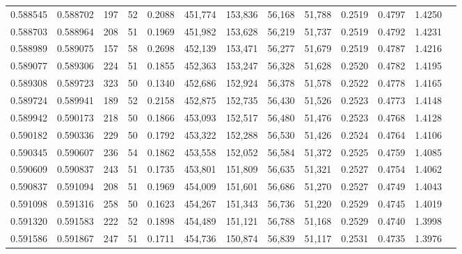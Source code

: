 \begin{tabular}{rrrrrrrrrrrrr}
0.588545 & 0.588702 &   197 &  52 &                                     0.2088 & 451,774 & 153,836 &  56,168 &  51,788 & 0.2519 & 0.4797 & 1.4250 \\
0.588703 & 0.588964 &   208 &  51 &                                     0.1969 & 451,982 & 153,628 &  56,219 &  51,737 & 0.2519 & 0.4792 & 1.4231 \\
0.588989 & 0.589075 &   157 &  58 &                                     0.2698 & 452,139 & 153,471 &  56,277 &  51,679 & 0.2519 & 0.4787 & 1.4216 \\
0.589077 & 0.589306 &   224 &  51 &                                     0.1855 & 452,363 & 153,247 &  56,328 &  51,628 & 0.2520 & 0.4782 & 1.4195 \\
0.589308 & 0.589723 &   323 &  50 &                                     0.1340 & 452,686 & 152,924 &  56,378 &  51,578 & 0.2522 & 0.4778 & 1.4165 \\
0.589724 & 0.589941 &   189 &  52 &                                     0.2158 & 452,875 & 152,735 &  56,430 &  51,526 & 0.2523 & 0.4773 & 1.4148 \\
0.589942 & 0.590173 &   218 &  50 &                                     0.1866 & 453,093 & 152,517 &  56,480 &  51,476 & 0.2523 & 0.4768 & 1.4128 \\
0.590182 & 0.590336 &   229 &  50 &                                     0.1792 & 453,322 & 152,288 &  56,530 &  51,426 & 0.2524 & 0.4764 & 1.4106 \\
0.590345 & 0.590607 &   236 &  54 &                                     0.1862 & 453,558 & 152,052 &  56,584 &  51,372 & 0.2525 & 0.4759 & 1.4085 \\
0.590609 & 0.590837 &   243 &  51 &                                     0.1735 & 453,801 & 151,809 &  56,635 &  51,321 & 0.2527 & 0.4754 & 1.4062 \\
0.590837 & 0.591094 &   208 &  51 &                                     0.1969 & 454,009 & 151,601 &  56,686 &  51,270 & 0.2527 & 0.4749 & 1.4043 \\
0.591098 & 0.591316 &   258 &  50 &                                     0.1623 & 454,267 & 151,343 &  56,736 &  51,220 & 0.2529 & 0.4745 & 1.4019 \\
0.591320 & 0.591583 &   222 &  52 &                                     0.1898 & 454,489 & 151,121 &  56,788 &  51,168 & 0.2529 & 0.4740 & 1.3998 \\
0.591586 & 0.591867 &   247 &  51 &                                     0.1711 & 454,736 & 150,874 &  56,839 &  51,117 & 0.2531 & 0.4735 & 1.3976 \\

\end{tabular}
